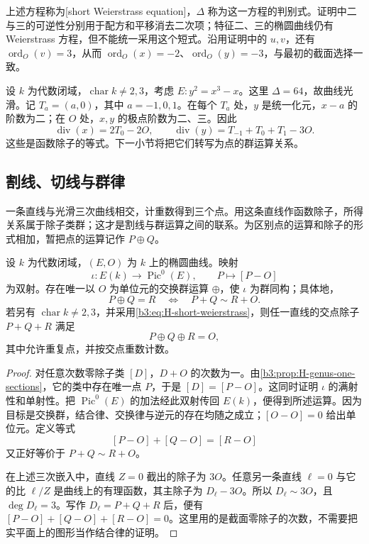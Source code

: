 上述方程称为[short Weierstrass equation]，\(\Delta\) 称为这一方程的判别式。证明中二与三的可逆性分别用于配方和平移消去二次项；特征二、三的椭圆曲线仍有 Weierstrass 方程，但不能统一采用这个短式。沿用证明中的 \(u,v\)，还有 \(\operatorname{ord}_O(v)=3\)，从而 \(\operatorname{ord}_O(x)=-2\)、\(\operatorname{ord}_O(y)=-3\)，与最初的截面选择一致。

\begin{example}\label{b3:exm:H-weierstrass-divisors}
	设 \(k\) 为代数闭域，\(\operatorname{char}k\ne2,3\)，考虑 \(E:y^2=x^3-x\)。这里 \(\Delta=64\)，故曲线光滑。记 \(T_a=(a,0)\)，其中 \(a=-1,0,1\)。在每个 \(T_a\) 处，\(y\) 是统一化元，\(x-a\) 的阶数为二；在 \(O\) 处，\(x,y\) 的极点阶数为二、三。因此
	\[
		\operatorname{div}(x)=2T_0-2O,
		\qquad
		\operatorname{div}(y)=T_{-1}+T_0+T_1-3O.
	\]
	这些是函数除子的等式。下一小节将把它们转写为点的群运算关系。
\end{example}

\subsection{割线、切线与群律}
\label{b3:subsec:H04:02}

一条直线与光滑三次曲线相交，计重数得到三个点。用这条直线作函数除子，所得关系属于除子类群；这才是割线与群运算之间的联系。为区别点的运算和除子的形式相加，暂把点的运算记作 \(P\oplus Q\)。

\begin{theorem}[椭圆曲线的群律]\label{b3:thm:H-elliptic-group-law}
	设 \(k\) 为代数闭域，\((E,O)\) 为 \(k\) 上的椭圆曲线。映射
	\[
		\iota:E(k)\longrightarrow\operatorname{Pic}^0(E),
		\qquad P\longmapsto[P-O]
	\]
	为双射。存在唯一以 \(O\) 为单位元的交换群运算 \(\oplus\)，使 \(\iota\) 为群同构；具体地，
	\[
		P\oplus Q=R\quad\Longleftrightarrow\quad P+Q\sim R+O.
	\]
	若另有 \(\operatorname{char}k\ne2,3\)，并采用\eqref{b3:eq:H-short-weierstrass}，则任一直线的交点除子 \(P+Q+R\) 满足
	\[
		P\oplus Q\oplus R=O,
	\]
	其中允许重复点，并按交点重数计数。
\end{theorem}
\begin{proof}
	对任意次数零除子类 \([D]\)，\(D+O\) 的次数为一。由\cref{b3:prop:H-genus-one-sections}，它的类中存在唯一点 \(P\)，于是 \([D]=[P-O]\)。这同时证明 \(\iota\) 的满射性和单射性。把 \(\operatorname{Pic}^0(E)\) 的加法经此双射传回 \(E(k)\)，便得到所述运算。因为目标是交换群，结合律、交换律与逆元的存在均随之成立；\([O-O]=0\) 给出单位元。定义等式
	\[
		[P-O]+[Q-O]=[R-O]
	\]
	又正好等价于 \(P+Q\sim R+O\)。

	在上述三次嵌入中，直线 \(Z=0\) 截出的除子为 \(3O\)。任意另一条直线 \(\ell=0\) 与它的比 \(\ell/Z\) 是曲线上的有理函数，其主除子为 \(D_\ell-3O\)。所以 \(D_\ell\sim3O\)，且 \(\deg D_\ell=3\)。写作 \(D_\ell=P+Q+R\) 后，便有 \([P-O]+[Q-O]+[R-O]=0\)。这里用的是截面零除子的次数，不需要把实平面上的图形当作结合律的证明。
\end{proof}

